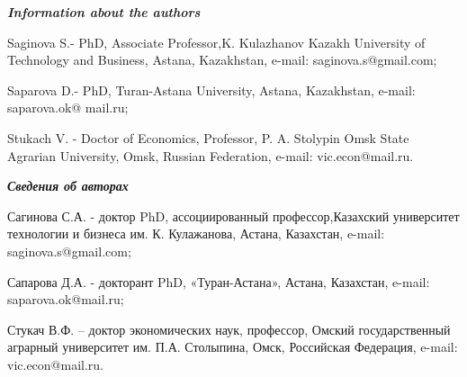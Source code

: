 \begin{authorinfo}
  \hspace{1em}\emph{{\bfseries Information about the authors}}

Saginova S.- PhD, Associate Professor,K. Kulazhanov Kazakh University of
Technology and Business, Astana, Kazakhstan, e-mail:
saginova.s@gmail.com;

Saparova D.- PhD, Turan-Astana University, Astana, Kazakhstan, e-mail:
saparova.ok@ mail.ru;

Stukach V. - Doctor of Economics, Professor, P. A. Stolypin Omsk State
Agrarian University, Omsk, Russian Federation, e-mail: vic.econ@mail.ru.

\hspace{1em}\emph{{\bfseries Сведения об авторах}}

Сагинова С.А. - доктор PhD, ассоциированный профессор,Казахский
университет технологии и бизнеса им. К. Кулажанова, Астана, Казахстан,
e-mail: saginova.s@gmail.com;

Сапарова Д.А. - докторант PhD, «Туран-Астана», Астана, Казахстан,
e-mail: saparova.ok@mail.ru;

Стукач В.Ф. -- доктор экономических наук, профессор, Омский
государственный аграрный университет им. П.А. Столыпина, Омск,
Российская Федерация, e-mail: vic.econ@mail.ru.
\end{authorinfo}


